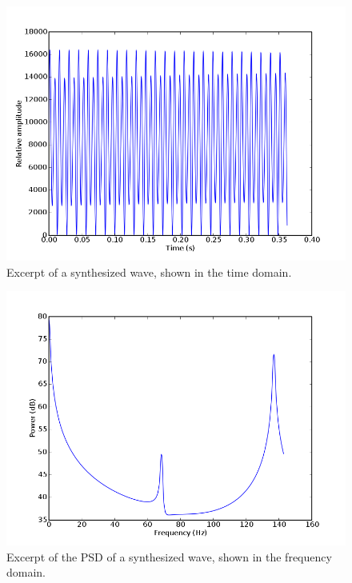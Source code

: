 \documentclass[twocolumn]{article}
\begin{document}
\begin{figure}
\centering
\includegraphics[width=\linewidth]{figures/synth-time.png}
\caption{Excerpt of a synthesized wave, shown in the time domain.}
\label{time}
\end{figure}

\begin{figure}
\centering
\includegraphics[width=\linewidth]{figures/synth-psd.png}
\caption{Excerpt of the PSD of a synthesized wave, shown in the frequency domain.}
\label{psd}
\end{figure}
\end{document}
